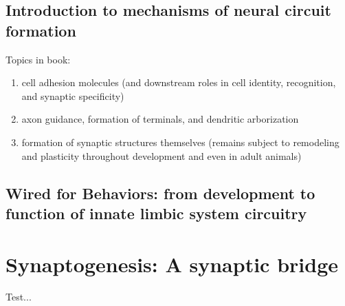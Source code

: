 \documentclass[11pt, a4paper, oneside]{article}   	%
\begin{document}
\subsection{Introduction to mechanisms of neural circuit formation}
Topics in book:
\begin{enumerate}
\item cell adhesion molecules (and downstream roles in cell identity, recognition, and synaptic specificity)
\item axon guidance, formation of terminals, and dendritic arborization
\item formation of synaptic structures themselves (remains subject to remodeling and plasticity throughout development and even in adult animals)
\end{enumerate}

\subsection{Wired for Behaviors: from development to function of innate limbic system circuitry}



\section{Synaptogenesis: A synaptic bridge \cite{Yates2016}}

Test...





\end{document}
